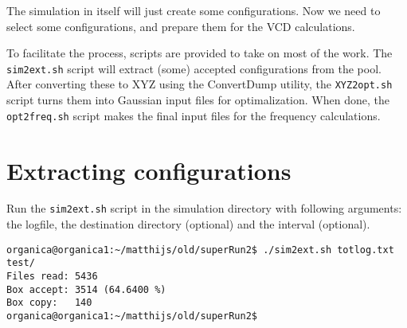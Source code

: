 
The simulation in itself will just create some configurations. Now we need to 
select some configurations, and prepare them for the VCD calculations.

To facilitate the process, scripts are provided to take on most of the work. 
The \verb|sim2ext.sh| script will extract (some) accepted configurations from 
the 
pool. After converting these to XYZ using the ConvertDump utility, the 
\verb|XYZ2opt.sh| script turns them into Gaussian input files for 
optimalization. When done, the \verb|opt2freq.sh| script makes the final input 
files for the frequency calculations.

\section{Extracting configurations}

Run the \verb|sim2ext.sh| script in the simulation directory with following 
arguments: the logfile, the destination directory (optional) and the interval 
(optional).

\begin{lstlisting}[caption=The sim2ext script]
organica@organica1:~/matthijs/old/superRun2$ ./sim2ext.sh totlog.txt test/
Files read: 5436
Box accept: 3514 (64.6400 %)
Box copy:   140
organica@organica1:~/matthijs/old/superRun2$
\end{lstlisting}
